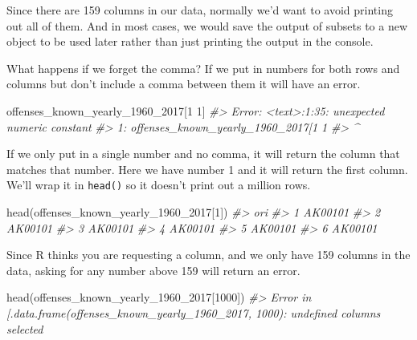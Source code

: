 \documentclass[
  12pt,
  openany]{book}
\newenvironment{Shaded}{\begin{snugshade}}{\end{snugshade}}
\newcommand{\CommentTok}[1]{\textcolor[rgb]{0.37,0.37,0.37}{\textit{#1}}}
\newcommand{\DecValTok}[1]{\textcolor[rgb]{0.06,0.06,0.06}{#1}}
\newcommand{\FunctionTok}[1]{\textcolor[rgb]{0,0,0}{#1}}
\newcommand{\NormalTok}[1]{#1}
\begin{document}
Since there are 159 columns in our data, normally we'd want to avoid printing out all of them. And in most cases, we would save the output of subsets to a new object to be used later rather than just printing the output in the console.

What happens if we forget the comma? If we put in numbers for both rows and columns but don't include a comma between them it will have an error.

\begin{Shaded}
\begin{Highlighting}[]
\NormalTok{offenses\_known\_yearly\_1960\_2017[}\DecValTok{1} \DecValTok{1}\NormalTok{]}
\CommentTok{\#\textgreater{} Error: \textless{}text\textgreater{}:1:35: unexpected numeric constant}
\CommentTok{\#\textgreater{} 1: offenses\_known\_yearly\_1960\_2017[1 1}
\CommentTok{\#\textgreater{}                                       \^{}}
\end{Highlighting}
\end{Shaded}

If we only put in a single number and no comma, it will return the column that matches that number. Here we have number 1 and it will return the first column. We'll wrap it in \texttt{head()} so it doesn't print out a million rows.

\begin{Shaded}
\begin{Highlighting}[]
\FunctionTok{head}\NormalTok{(offenses\_known\_yearly\_1960\_2017[}\DecValTok{1}\NormalTok{])}
\CommentTok{\#\textgreater{}       ori}
\CommentTok{\#\textgreater{} 1 AK00101}
\CommentTok{\#\textgreater{} 2 AK00101}
\CommentTok{\#\textgreater{} 3 AK00101}
\CommentTok{\#\textgreater{} 4 AK00101}
\CommentTok{\#\textgreater{} 5 AK00101}
\CommentTok{\#\textgreater{} 6 AK00101}
\end{Highlighting}
\end{Shaded}

Since R thinks you are requesting a column, and we only have 159 columns in the data, asking for any number above 159 will return an error.

\begin{Shaded}
\begin{Highlighting}[]
\FunctionTok{head}\NormalTok{(offenses\_known\_yearly\_1960\_2017[}\DecValTok{1000}\NormalTok{])}
\CommentTok{\#\textgreater{} Error in \textasciigrave{}[.data.frame\textasciigrave{}(offenses\_known\_yearly\_1960\_2017, 1000): undefined columns selected}
\end{Highlighting}
\end{Shaded}
\end{document}
